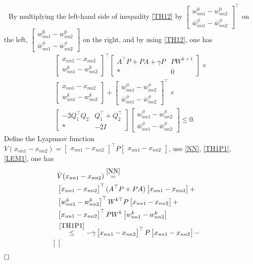 \documentclass[journal,twoside,web]{ieeecolor}
\renewenvironment{proof}{\vspace{.1cm}\noindent{\sc Proof.}\hspace{0.10cm}\,\,}{$\hfill\Box$\vspace{.1cm}}
\newcommand{\bbm}[1]{\left[\begin{matrix} #1 \end{matrix}\right]}
\begin{document}
\begin{proof}
By multiplying the left-hand side of inequality \eqref{TH12} by $\bbm{
w_{nn1}^0-w_{nn2}^0
 \\
\bar{w}_{nn1}^{\phi}-\bar{w}_{nn2}^{\phi}
}^\top$ on the left, $\bbm{
w_{nn1}^0-w_{nn2}^0
 \\
\bar{w}_{nn1}^{\phi}-\bar{w}_{nn2}^{\phi}
}$ on the right, and by using \eqref{TH12}, one has 
\begin{equation}\label{TH1P1}
\begin{aligned}
&\begin{bmatrix}
  x_{nn1}-x_{nn2}\\
w_{nn1}^k -w_{nn2}^k
\end{bmatrix}^\top
\begin{bmatrix}
   A^\top P+PA+ \gamma P &PW^{k+1}\\
   \ast & 0
\end{bmatrix}\times\\&\begin{bmatrix}
   x_{nn1}-x_{nn2}\\
w_{nn1}^k -w_{nn2}^k
\end{bmatrix}+\begin{bmatrix}
w_{nn1}^{\phi}-w_{nn2}^{\phi}
 \\
\bar{w}_{nn1}^{\phi}-\bar{w}_{nn2}^{\phi}
\end{bmatrix}^\top \times\\&\begin{bmatrix}
 -2Q_1^\top Q_2&Q_1^\top+Q_2^\top
 \\
\ast&-2I
\end{bmatrix}\begin{bmatrix}
w_{nn1}^{\phi}-w_{nn2}^{\phi}
 \\
\bar{w}_{nn1}^{\phi}-\bar{w}_{nn2}^{\phi}
\end{bmatrix}\leq 0.
\end{aligned}
\end{equation}
Define the Lyapunov function $V( x_{nn1}-x_{nn2})=\bbm{ x_{nn1}-x_{nn2}}^\top P \bbm{ x_{nn1}-x_{nn2}}$, use \eqref{NN}, \eqref{TH1P1}, \eqref{LEM1}, one has
\begin{equation}\label{TH1P2}
\begin{aligned}
&\dot{V}( x_{nn1}-x_{nn2})\overset{\eqref{NN}}{=}\\&\bbm{ x_{nn1}-x_{nn2}}^\top( A^\top P+PA)\bbm{ x_{nn1}-x_{nn2}}+\\&\bbm{w_{nn1}^k-w_{nn2}^k}^\top  W^{k\top}P\bbm{ x_{nn1}-x_{nn2}}+\\&\bbm{ x_{nn1}-x_{nn2}}^\top PW^k\bbm{w_{nn1}^k-w_{nn2}^k}\\&\overset{\eqref{TH1P1}}{\leq}-\gamma \bbm{ x_{nn1}-x_{nn2}}^\top P \bbm{ x_{nn1}-x_{nn2}}-\\&\begin{bmatrix}

\end{bmatrix}
\end{aligned}
\end{equation}
\end{proof}
\end{document}
